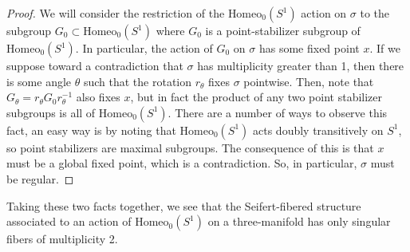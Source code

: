 \documentclass[10pt, oneside]{article}
\newcommand{\homeoS}{\text{Homeo}_0(S^1)}
\theoremstyle{definition}
\theoremstyle{definition}
\begin{document}
\begin{proof}
   We will consider the restriction of the $\homeoS$ action on $\sigma$ to the subgroup $G_0\subset \homeoS$ where $G_0$ is a point-stabilizer subgroup of $\homeoS$. In particular, the action of $G_0$ on $\sigma$ has some fixed point $x$. If we suppose toward a contradiction that $\sigma$ has multiplicity greater than 1, then there is some angle $\theta$ such that the rotation $r_\theta$ fixes $\sigma$ pointwise. Then, note that $G_\theta = r_\theta G_0 r_\theta^{-1}$ also fixes $x$, but in fact the product of any two point stabilizer subgroups is all of $\homeoS$. There are a number of ways to observe this fact, an easy way is by noting that $\homeoS$ acts doubly transitively on $S^1$, so point stabilizers are maximal subgroups. The consequence of this is that $x$ must be a global fixed point, which is a contradiction. So, in particular, $\sigma$ must be regular.
\end{proof} 

\noindent Taking these two facts together, we see that the Seifert-fibered structure associated to an action of $\homeoS$ on a three-manifold has only singular fibers of multiplicity 2.

\listoftodos[Notes]
\printbibliography
\end{document}
